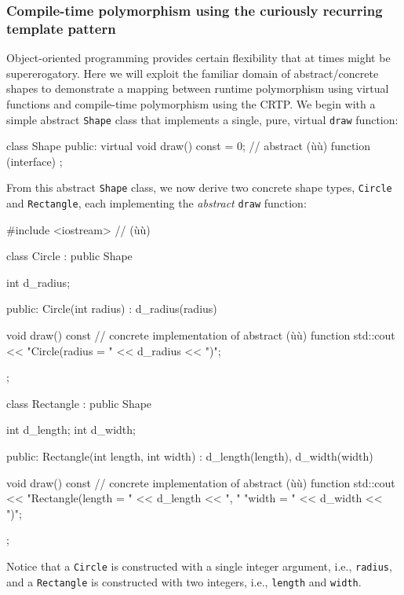 \subsubsection[Compile-time polymorphism using the curiously recurring template pattern]{Compile-time polymorphism using the curiously recurring template pattern}\label{compile-time-polymorphism-using-crtp}

Object-oriented programming provides certain flexibility that at times
might be supererogatory. Here we will exploit the familiar domain of
abstract/concrete shapes to demonstrate a mapping between runtime
polymorphism using virtual functions and compile-time polymorphism using
the CRTP. We begin with a simple abstract \lstinline!Shape! class that
implements a single, pure, virtual \lstinline!draw! function:

\begin{emcppslisting}[emcppsbatch=e6]
class Shape
{
public:
    virtual void draw() const = 0;  // abstract (ù{}ù) function (interface)
};
\end{emcppslisting}

\noindent From this abstract \lstinline!Shape! class, we now derive two concrete
shape types, \lstinline!Circle! and \mbox{\lstinline!Rectangle!}, each implementing
the \emph{abstract} \lstinline!draw! function:

\begin{emcppslisting}[emcppsbatch=e6]
#include <iostream>  // (ù{}ù)

class Circle : public Shape
{
    int d_radius;

public:
    Circle(int radius) : d_radius(radius) { }

    void draw() const  // concrete implementation of abstract (ù{}ù) function
    {
        std::cout << "Circle(radius = " << d_radius << ")\n";
    }
};

class Rectangle : public Shape
{
    int d_length;
    int d_width;

public:
    Rectangle(int length, int width) : d_length(length), d_width(width) { }

    void draw() const  // concrete implementation of abstract (ù{}ù) function
    {
        std::cout << "Rectangle(length = " << d_length << ", "
                                "width = " << d_width  << ")\n";
    }
};
\end{emcppslisting}

\noindent Notice that a \lstinline!Circle! is constructed with a single integer
argument, i.e., \lstinline!radius!, and a \lstinline!Rectangle! is constructed
with two integers, i.e., \lstinline!length! and \lstinline!width!.

